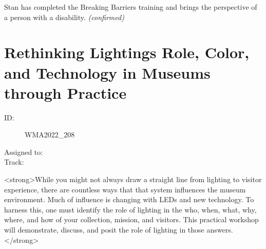 \documentclass{report}
\begin{document}
                Stan has completed the Breaking Barriers training and brings the perspective of a person with a disability.
                \emph{ (confirmed) }
              

              
        
          \newpage
          \section{ Rethinking Lightings Role, Color, and Technology in Museums through Practice }
            \begin{description}
              \item [ID:]
              WMA2022\_208

              \item [Assigned to:]
                \item [Track:]
              \end{description}

              <strong>While you might not always draw a straight line from lighting to visitor experience, there are countless ways that that system influences the museum environment. Much of influence is changing with LEDs and new technology. To harness this, one must identify the role of lighting in the who, when, what, why, where, and how of your collection, mission, and visitors. This practical workshop will demonstrate, discuss, and posit the role of lighting in those answers.</strong>
\end{document}
